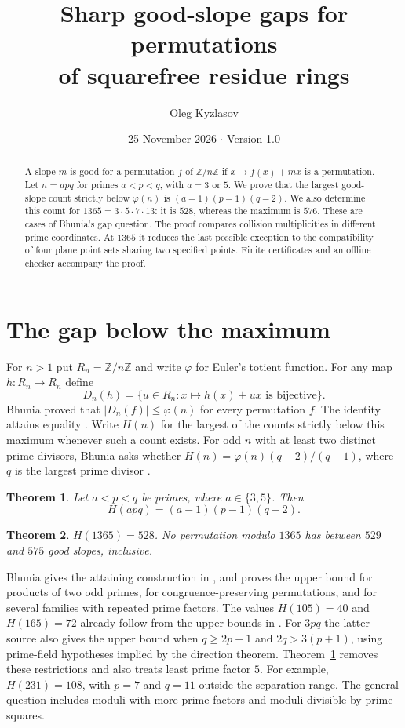 \documentclass[11pt,a4paper]{article}
\title{\bfseries Sharp good-slope gaps for permutations\\of squarefree residue rings}
\author{Oleg Kyzlasov}
\date{25 November 2026 \quad $\cdot$ \quad Version 1.0}
\newtheorem{theorem}{Theorem}
\newcommand{\Z}{\mathbb Z}
\begin{document}
\maketitle
\begin{abstract}
A slope $m$ is good for a permutation $f$ of $\Z/n\Z$ if $x\mapsto f(x)+mx$ is a permutation. Let $n=apq$ for primes $a<p<q$, with $a=3$ or $5$. We prove that the largest good-slope count strictly below $\varphi(n)$ is $(a-1)(p-1)(q-2)$. We also determine this count for $1365=3\cdot5\cdot7\cdot13$: it is $528$, whereas the maximum is $576$. These are cases of Bhunia's gap question. The proof compares collision multiplicities in different prime coordinates. At $1365$ it reduces the last possible exception to the compatibility of four plane point sets sharing two specified points. Finite certificates and an offline checker accompany the proof.
\end{abstract}
\section{The gap below the maximum}
For $n>1$ put $R_n=\Z/n\Z$ and write $\varphi$ for Euler's totient function. For any map $h:R_n\to R_n$ define
\[
 D_n(h)=\{u\in R_n:x\mapsto h(x)+ux\text{ is bijective}\}.
\]
Bhunia proved that $|D_n(f)|\le\varphi(n)$ for every permutation $f$. The identity attains equality \cite[Theorem~3.1]{first}. Write $H(n)$ for the largest of the counts strictly below this maximum whenever such a count exists. For odd $n$ with at least two distinct prime divisors, Bhunia asks whether $H(n)=\varphi(n)(q-2)/(q-1)$, where $q$ is the largest prime divisor \cite[Question~10.2]{second}.

\begin{theorem}\label{thm:family}
Let $a<p<q$ be primes, where $a\in\{3,5\}$. Then
\[
 H(apq)=(a-1)(p-1)(q-2).
\]
\end{theorem}
\begin{theorem}\label{thm:four}
$H(1365)=528$. No permutation modulo $1365$ has between $529$ and $575$ good slopes, inclusive.
\end{theorem}

Bhunia gives the attaining construction in \cite[Proposition~9.6]{second}, and proves the upper bound for products of two odd primes, for congruence-preserving permutations, and for several families with repeated prime factors. The values $H(105)=40$ and $H(165)=72$ already follow from the upper bounds in \cite{aft105,aft165}. For $3pq$ the latter source also gives the upper bound when $q\ge 2p-1$ and $2q>3(p+1)$, using prime-field hypotheses implied by the direction theorem. Theorem~\ref{thm:family} removes these restrictions and also treats least prime factor $5$. For example, $H(231)=108$, with $p=7$ and $q=11$ outside the separation range. The general question includes moduli with more prime factors and moduli divisible by prime squares.
\end{document}
